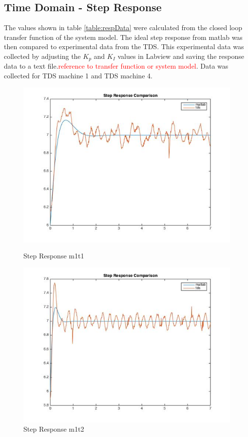 \documentclass[11pt,titlepage]{article}
\begin{document}
    \subsection{Time Domain - Step Response} \label{sub:step}
    The values shown in table \ref{table:respData} were calculated from the closed loop transfer function of the system model. The ideal step response from matlab was then compared to experimental data from the TDS. This experimental data was collected by adjusting the $K_p$ and $K_I$ values in Labview and saving the response data to a text file.\textcolor{red}{reference to transfer function or system model}. Data was collected for TDS machine 1 and TDS machine 4.
    \begin{figure}[H]
        \centering
        \begin{minipage}{.5\textwidth}
            \centering
            \includegraphics[scale=.4]{stepM1_T1}
            \caption{Step Response m1t1}
            \label{fig:stepM1_T1}
        \end{minipage}%
        \begin{minipage}{.5\textwidth}
            \centering
            \includegraphics[scale=.4]{stepM1_T2}
            \caption{Step Response m1t2}
            \label{fig:stepM1_T2}
        \end{minipage}%
    \end{figure}
\end{document}
